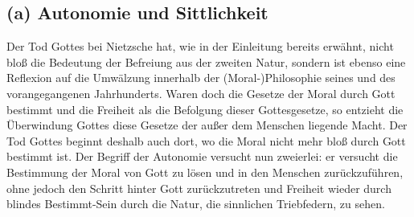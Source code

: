 \documentclass[12pt, a4paper, openany]{report}
\begin{document}
\subsection{(a) Autonomie und Sittlichkeit}
Der Tod Gottes bei Nietzsche hat, wie in der Einleitung bereits erwähnt, nicht bloß die Bedeutung der Befreiung aus der zweiten Natur, sondern ist ebenso eine Reflexion auf die Umwälzung innerhalb der (Moral-)Philosophie seines und des vorangegangenen Jahrhunderts. 
Waren doch die Gesetze der Moral durch Gott bestimmt und die Freiheit als die Befolgung dieser Gottesgesetze, so entzieht die Überwindung Gottes diese Gesetze der außer dem Menschen liegende Macht.
Der Tod Gottes beginnt deshalb auch dort, wo die Moral nicht mehr bloß durch Gott bestimmt ist. 
Der Begriff der Autonomie versucht nun zweierlei: 
er versucht die Bestimmung der Moral von Gott zu lösen und in den Menschen zurückzuführen, ohne jedoch den Schritt hinter Gott zurückzutreten und Freiheit wieder durch blindes Bestimmt-Sein durch die Natur, die sinnlichen Triebfedern, zu sehen. 
\end{document}
